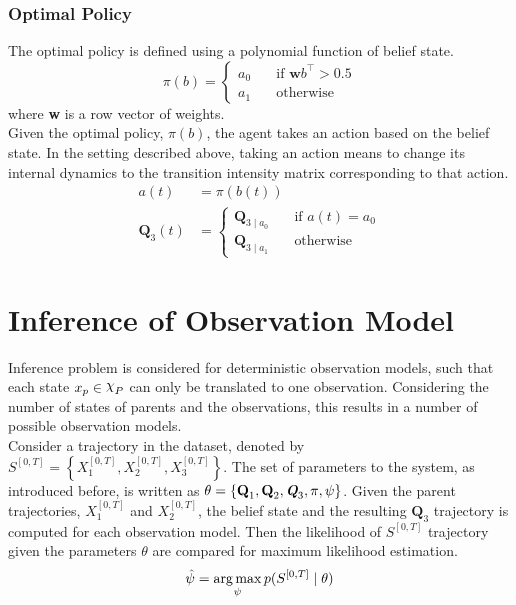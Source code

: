 \subsubsection{Optimal Policy}
The optimal policy is defined using a polynomial function of belief state.
\begin{equation}
\pi(b) = 
\begin{cases}
a_0 & \quad \text{if } \textbf{w}b^\intercal > 0.5 \\
a_1 & \quad \text{otherwise}
\end{cases}
\label{eq:policy}
\end{equation}
where \textbf{w} is a row vector of weights.\\
Given the optimal policy, $ \pi(b) $, the agent takes an action based on the belief state. In the setting described above, taking an action means to change its internal dynamics to the transition intensity matrix corresponding to that action.
\begin{align}
a(t) &= \pi(b(t))\\
\textbf{Q}_3(t) & = \begin{cases}
\textbf{Q}_{3\mid a_{0}} & \quad \text{if } a(t) = a_0 \\
\textbf{Q}_{3\mid a_{1}} & \quad \text{otherwise}
\end{cases}
\label{eq:Q_3_traj}
\end{align}

\section{Inference of Observation Model}
\label{sec:inf_setup}
Inference problem is considered for deterministic observation models, such that each state $ x_p \in \rchi_P $ can only be translated to one observation. Considering the number of states of parents and the observations, this results in a number of possible observation models. \\
Consider a trajectory in the dataset, denoted by $ S^{[0,T]} = \left\lbrace X_1^{[0,T]} , X_2^{[0,T]}, X_3^{[0,T]}\right\rbrace $. The set of parameters to the system, as introduced before, is written as $  \theta = \left\lbrace  \textbf{Q}_{1}, \textbf{Q}_{2}, \textit{\textbf{Q}}_3, \pi, \psi \right\rbrace $. Given the parent trajectories, $ X_1^{[0,T]} $ and $ X_2^{[0,T]} $, the belief state and the resulting $ \textbf{Q}_3 $ trajectory is computed for each observation model. Then the likelihood of $ S^{[0,T]} $ trajectory given the parameters $ \theta $ are compared for maximum likelihood estimation.
\begin{equation}
\hat{\psi} = \operatorname*{arg\,max}_\psi p(S^{[0,T]} \mid \theta )
\label{eq:max_llh_est}
\end{equation}

